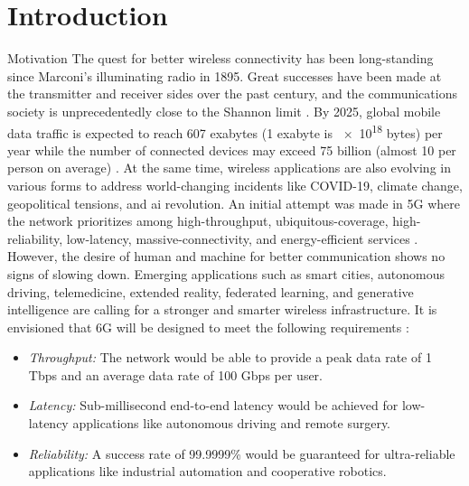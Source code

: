 
\graphicspath{{assets/chapter_1/}}

\chapter{Introduction}\label{ch:introduction}

\begin{section}{Motivation}
	The quest for better wireless connectivity has been long-standing since Marconi's illuminating radio in 1895.
	Great successes have been made at the transmitter and receiver sides over the past century, and the communications society is unprecedentedly close to the Shannon limit \cite{Shannon1948}.
	By 2025, global mobile data traffic is expected to reach {607} exabytes (1 exabyte is \num{e18} bytes) per year \cite{Tariq2020} while the number of connected devices may exceed {75} billion (almost 10 per person on average) \cite{Georgiev2024}.
	At the same time, wireless applications are also evolving in various forms to address world-changing incidents like COVID-19, climate change, geopolitical tensions, and \gls{ai} revolution.
	An initial attempt was made in 5G where the network prioritizes among high-throughput, ubiquitous-coverage, high-reliability, low-latency, massive-connectivity, and energy-efficient services \cite{Shafi2017}.
	However, the desire of human and machine for better communication shows no signs of slowing down.
	Emerging applications such as smart cities, autonomous driving, telemedicine, extended reality, federated learning, and generative intelligence are calling for a stronger and smarter wireless infrastructure.
	It is envisioned that 6G will be designed to meet the following requirements \cite{Tataria2021,Alsabah2021,Jiang2021}:
	\begin{itemize}
		\item \emph{Throughput:} The network would be able to provide a peak data rate of 1 Tbps and an average data rate of 100 Gbps per user.
		\item \emph{Latency:} Sub-millisecond end-to-end latency would be achieved for low-latency applications like autonomous driving and remote surgery.
		\item \emph{Reliability:} A success rate of 99.9999\% would be guaranteed for ultra-reliable applications like industrial automation and cooperative robotics.

\end{itemize}
\end{section}
